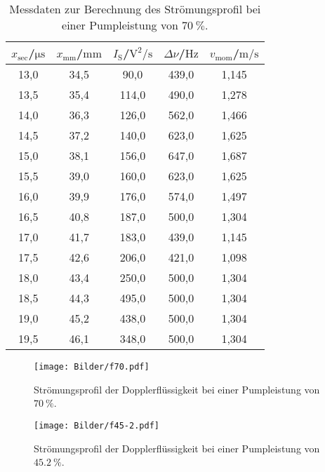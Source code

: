 \begin{table}
\centering
\caption{Messdaten zur Berechnung des Strömungsprofil bei einer Pumpleistung von $\SI{70}{\percent}$.}
\label{tab:pl70}
\begin{tabular}{ccccc}
  \toprule
  $x_\mathrm{sec}$/$\si{\micro\second}$ & $x_\mathrm{mm}$/$\si{\milli\meter}$ & $I_\mathrm{S}$/$\si{\square\volt\per\second}$ & $\Delta \nu$/$\si{\Hz}$&$v_\mathrm{mom}$/$\si{\meter\per\second}$ \\
\midrule
13,0 & 34,5 & 90,0 & 439,0 & 1,145 \\
13,5 & 35,4 & 114,0 & 490,0 & 1,278 \\
14,0 & 36,3 & 126,0 & 562,0 & 1,466 \\
14,5 & 37,2 & 140,0 & 623,0 & 1,625 \\
15,0 & 38,1 & 156,0 & 647,0 & 1,687 \\
15,5 & 39,0 & 160,0 & 623,0 & 1,625 \\
16,0 & 39,9 & 176,0 & 574,0 & 1,497 \\
16,5 & 40,8 & 187,0 & 500,0 & 1,304 \\
17,0 & 41,7 & 183,0 & 439,0 & 1,145 \\
17,5 & 42,6 & 206,0 & 421,0 & 1,098 \\
18,0 & 43,4 & 250,0 & 500,0 & 1,304 \\
18,5 & 44,3 & 495,0 & 500,0 & 1,304 \\
19,0 & 45,2 & 438,0 & 500,0 & 1,304 \\
19,5 & 46,1 & 348,0 & 500,0 & 1,304 \\
\bottomrule
\end{tabular}
\end{table}



\begin{figure}
  \centering
  \texttt{[image: Bilder/f70.pdf]}
  \caption{Strömungsprofil der Dopplerflüssigkeit bei einer Pumpleistung von $\SI{70}{\percent}$.}
  \label{fig:f70}
\end{figure}
\begin{figure}
  \centering
  \texttt{[image: Bilder/f45-2.pdf]}
  \caption{Strömungsprofil der Dopplerflüssigkeit bei einer Pumpleistung von $\SI{45.2}{\percent}$.}
  \label{fig:f45}
\end{figure}

